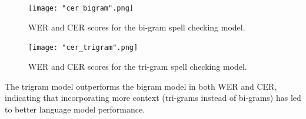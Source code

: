 \documentclass[11pt, a4paper]{article}
\begin{document}
	 \begin{figure}
	    \centering
	    \texttt{[image: "cer\_bigram".png]}
	    \caption{WER and CER scores for the bi-gram spell checking model.}
	    \label{fig::cer_bigram}
	\end{figure}
	
	
	 \begin{figure}
	    \centering
	    \texttt{[image: "cer\_trigram".png]}
	    \caption{WER and CER scores for the tri-gram spell checking model.}
	    \label{fig::cer_trigram}
	\end{figure}
 
	The trigram model outperforms the bigram model in both WER and CER, indicating that incorporating more context (tri-grams instead of bi-grams) has led to better language model performance.
	
\end{document}

